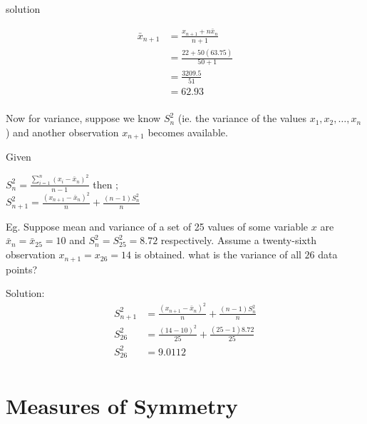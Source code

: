 \documentclass[12pt]{article}
\begin{document}
solution



\begin{align*}
    \bar{x}_{n + 1} & = \frac{x_{n+1} + n\bar{x}_n}{n + 1} \\
                    & = \frac{22 + 50(63.75)}{50 + 1}      \\
                    & = \frac{3209.5}{51}                  \\
                    & = 62.93                              \\
\end{align*}

Now for variance, suppose we know $S_n^2$ (ie. the variance of the values $x_1, x_2, \ldots, x_n$) and another observation $x_{n + 1}$ becomes available.

Given
\begin{center}
    $S_n^2 = \frac{\sum_{i = 1}^{n}(x_i - \bar{x}_n)^2}{n - 1}$ then ; \\

    $S_{n + 1}^2 = \frac{(x_{n+1} - \bar{x}_n)^2}{n} + \frac{(n - 1)S_n^2}{n}$
\end{center}

Eg. Suppose mean and variance of a set of 25 values of some variable $x$ are $\bar{x}_n = \bar{x}_{25} = 10$ and $S_n^2 = S_{25}^2 = 8.72$ respectively. Assume a twenty-sixth observation $x_{n+1} = x_26 = 14$ is obtained. what is the variance of all $26$ data points?

Solution:
\begin{align*}
    S_{n + 1}^2 & = \frac{(x_{n+1} - \bar{x}_n)^2}{n} + \frac{(n - 1)S_n^2}{n} \\
    S_{26}^2    & = \frac{(14 - 10)^2}{25} + \frac{(25 - 1)8.72}{25}           \\
    S_{26}^2    & = 9.0112                                                     \\
\end{align*}



\newpage

\section{Measures of Symmetry}%
\end{document}
